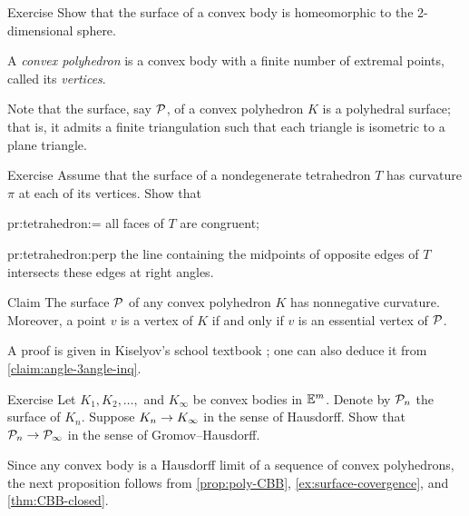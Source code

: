 \begin{thm}{Exercise}\label{ex:surf-S2}
Show that the surface of a convex body is homeomorphic to the 2-dimensional sphere.
\end{thm}

A \emph{convex polyhedron} is a convex body with a finite number of extremal points, called its \emph{vertices}.

Note that the surface, say $\mathcal{P}$, of a convex polyhedron $K$ is a polyhedral surface;
that is, it admits a finite triangulation such that each triangle is isometric to a plane triangle.

\begin{thm}{Exercise}\label{pr:tetrahedron}
Assume that the surface of a nondegenerate tetrahedron $T$ has curvature $\pi$ at each of its vertices.
Show that

\begin{subthm}{pr:tetrahedron:=}
all faces of $T$ are congruent;
\end{subthm}

\begin{subthm}{pr:tetrahedron:perp} the line containing the midpoints of opposite edges of $T$ intersects these edges at right angles.
\end{subthm}

\end{thm}

\begin{thm}{Claim}\label{clm:total-angle}
The surface $\mathcal{P}$ of any convex polyhedron $K$ has nonnegative curvature.
Moreover, a point $v$ is a vertex of $K$ if and only if
$v$ is an essential vertex of $\mathcal{P}$.
\end{thm}

A proof is given in Kiselyov's school textbook \cite[§ 48]{kiselev-stereo-en};
one can also deduce it from \ref{claim:angle-3angle-inq}.

\begin{thm}{Exercise}\label{ex:surface-covergence}
Let $K_1,K_2,\dots,$ and $K_\infty$ be convex bodies in $\mathbb{E}^m$.
Denote by $\mathcal{P}_n$ the surface of $K_n$.
Suppose $K_n\to K_\infty$ in the sense of Hausdorff.
Show that $\mathcal{P}_n\to \mathcal{P}_\infty$ in the sense of Gromov--Hausdorff.
\end{thm}

Since any convex body is a Hausdorff limit of a sequence of convex polyhedrons, the next proposition follows from \ref{prop:poly-CBB}, \ref{ex:surface-covergence}, and \ref{thm:CBB-closed}.


